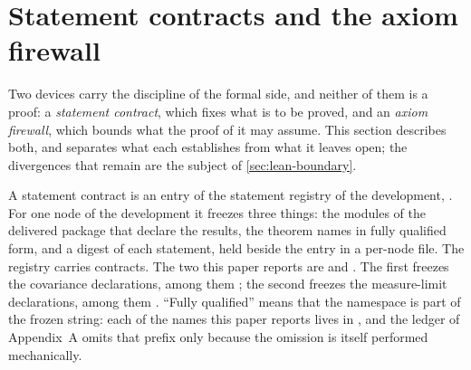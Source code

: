 %
%
\section{Statement contracts and the axiom firewall}\label{sec:lean-contracts}

Two devices carry the discipline of the formal side, and neither of them is a
proof: a \emph{statement contract}, which fixes what is to be proved, and an
\emph{axiom firewall}, which bounds what the proof of it may assume. This
section describes both, and separates what each establishes from what it leaves
open; the divergences that remain are the subject of \cref{sec:lean-boundary}.

A statement contract is an entry of the statement registry of the development,
. For one node of the development
it freezes three things: the modules of the delivered package that declare the
results, the theorem names in fully qualified form, and a digest of each
statement, held beside the entry in a per-node file. The registry carries
\NumContracts{} contracts. The two this paper reports are
 and
. The first freezes
the covariance declarations, among them
; the second
freezes the measure-limit declarations, among them
. ``Fully qualified''
means that the namespace is part of the frozen string: each of the
\NumChainTheorems{} names this paper reports lives in
, and the ledger of Appendix~A omits that prefix
only because the omission is itself performed mechanically.

